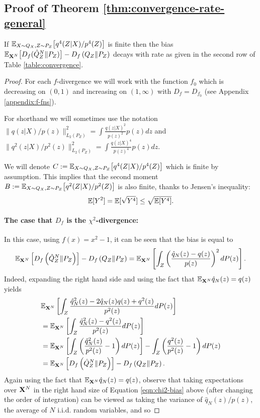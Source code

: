 \subsection{Proof of Theorem \ref{thm:convergence-rate-general}}\label{proof:thm2}

\begin{theorem}
If $\mathbb{E}_{X\sim Q_X, Z\sim P_Z}\bigl[ q^4(Z|X) / p^4(Z) \bigr]$ is finite then
the bias $\mathbb{E}_{\mathbf{X}^N}\bigl[D_f( \hat{Q}_Z^N \| P_Z)\bigr] - D_f\left( Q_{Z} \| P_Z\right)$ decays with rate as given in the second row of Table \ref{table:convergence}.
\end{theorem}

\begin{proof}
For each $f$-divergence we will work with the function $f_0$ which is decreasing on $(0,1)$ and increasing on $(1, \infty)$ with $D_f = D_{f_0}$ (see Appendix \ref{appendix:f-fns}).

For shorthand we will sometimes use the notation $\| q(z|X)/p(z)\|^2_{L_2(P_Z)} = \int \frac{q(z|X)^2}{p(z)^2} p(z) dz$ and $\| q^2(z|X)/p^2(z)\|^2_{L_2(P_Z)} = \int \frac{q(z|X)^4}{p(z)^4} p(z) dz$.

We will denote $C:= \mathbb{E}_{X\sim Q_X, Z\sim P_Z}\bigl[ q^4(Z|X) / p^4(Z) \bigr]$ which is finite by assumption. 
This implies that the second moment $B:= \mathbb{E}_{X\sim Q_X, Z\sim P_Z}\bigl[ q^2(Z|X) / p^2(Z) \bigr]$ is also finite, thanks to Jensen's inequality: 
\[
\mathbb{E}[Y^2] = \mathbb{E}[\sqrt{Y^4}]\leq \sqrt{\mathbb{E}[Y^4]}.
\]

\paragraph{The case that $D_f$ is the $\chi^2$-divergence:}
% 
In this case, using $f(x) = x^2-1$, it can be seen that the bias is equal to
\begin{align}\label{eqn:chi2-bias}
    \mathbb{E}_{\mathbf{X}^N} \left[ D_{f}\left( \hat{Q}_Z^N \| P_Z\right)\right] - D_{f}\left( Q_{Z} \| P_Z\right) = \mathbb{E}_{\mathbf{X}^N}\left[ \int_Z  \left(\frac{\hat{q}_N(z) - q(z)}{p(z)}\right)^2 dP(z) \right].
\end{align}
Indeed, expanding the right hand side and using the fact that $\mathbb{E}_{\mathbf{X}^N}\hat{q}_N(z) = q(z)$ yields
\begin{align*}
    &\mathbb{E}_{\mathbf{X}^N}\left[ \int_Z  \frac{\hat{q}^2_N(z) - 2\hat{q}_N(z)q(z) + q^2(z)}{p^2(z)} dP(z) \right]\\
    &=\mathbb{E}_{\mathbf{X}^N}\left[ \int_Z  \frac{\hat{q}^2_N(z) - q^2(z)}{p^2(z)} dP(z) \right]\\
    &=\mathbb{E}_{\mathbf{X}^N}\left[ \int_Z  \left(\frac{\hat{q}^2_N(z)}{p^2(z)} - 1 \right)dP(z) \right] - \int_Z  \left(\frac{q^2(z)}{p^2(z)} - 1\right) dP(z)\\
    &= \mathbb{E}_{\mathbf{X}^N} \left[ D_{f}\left( \hat{Q}_Z^N \| P_Z\right)\right] - D_{f}\left( Q_{Z} \| P_Z\right).
\end{align*}
Again using the fact that $\mathbb{E}_{\mathbf{X}^N}\hat{q}_N(z) = q(z)$, observe that taking expectations over $\mathbf{X}^N$ in the right hand size of Equation \ref{eqn:chi2-bias} above (after changing the order of integration) can be viewed as taking the variance of $\hat{q}_N(z)/p(z)$, the average of $N$ i.i.d. random variables, and so


\end{proof}
